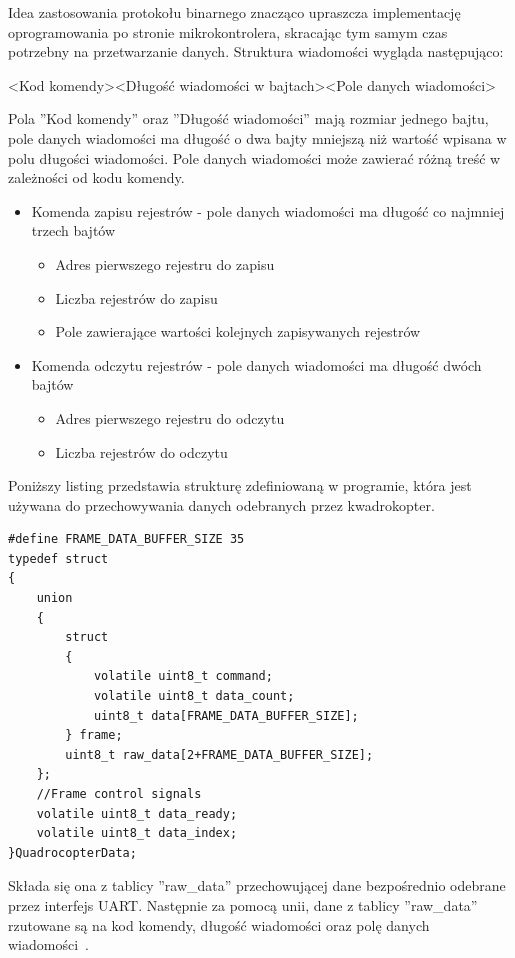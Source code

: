 Idea zastosowania protokołu binarnego znacząco upraszcza implementację oprogramowania po stronie mikrokontrolera, skracając tym samym czas potrzebny na przetwarzanie danych. Struktura wiadomości wygląda następująco:

<Kod komendy><Długość wiadomości w bajtach><Pole danych wiadomości>

Pola ''Kod komendy'' oraz ''Długość wiadomości'' mają rozmiar jednego bajtu, pole danych wiadomości ma długość o dwa bajty mniejszą niż wartość wpisana w polu długości wiadomości.
Pole danych wiadomości może zawierać różną treść w zależności od kodu komendy. 
\begin{itemize}
	\item Komenda zapisu rejestrów - pole danych wiadomości ma długość co najmniej trzech bajtów
	\begin{itemize}
		\item Adres pierwszego rejestru do zapisu
		\item Liczba rejestrów do zapisu
		\item Pole zawierające wartości kolejnych zapisywanych rejestrów
	\end{itemize}
	\item Komenda odczytu rejestrów - pole danych wiadomości ma długość dwóch bajtów
	\begin{itemize}
		\item Adres pierwszego rejestru do odczytu
		\item Liczba rejestrów do odczytu
	\end{itemize} 	
\end{itemize} 

Poniższy listing przedstawia strukturę zdefiniowaną w programie, która jest używana do przechowywania danych odebranych  przez kwadrokopter.

\begin{lstlisting}
#define FRAME_DATA_BUFFER_SIZE 35
typedef struct
{
    union
    {
        struct
        {
            volatile uint8_t command;
            volatile uint8_t data_count;
            uint8_t data[FRAME_DATA_BUFFER_SIZE];
        } frame;
        uint8_t raw_data[2+FRAME_DATA_BUFFER_SIZE];
    };
    //Frame control signals
    volatile uint8_t data_ready;
    volatile uint8_t data_index;
}QuadrocopterData;
\end{lstlisting}

Składa się ona z tablicy ''raw\_data'' przechowującej dane bezpośrednio odebrane przez interfejs UART. Następnie za pomocą unii, dane z tablicy ''raw\_data'' rzutowane są na kod komendy, długość wiadomości oraz polę danych wiadomości~\cite{prog1}.

